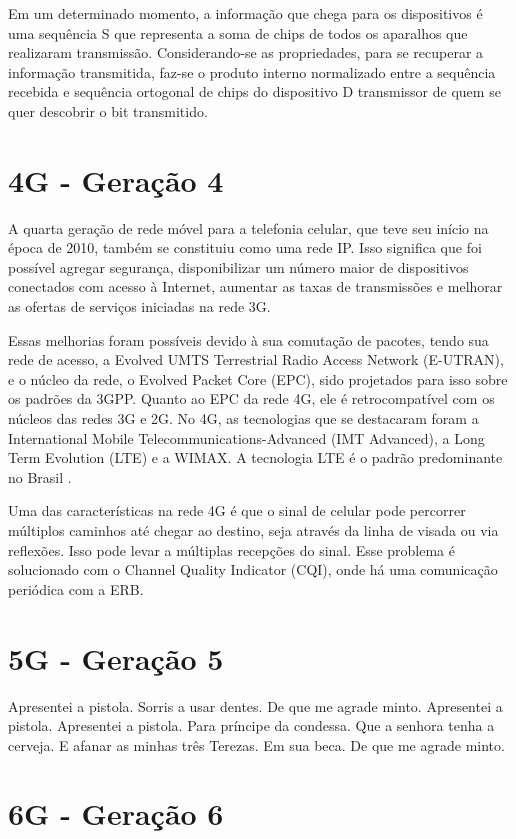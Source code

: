 \documentclass[11pt,oneside,a4paper]{abntex2}
\begin{document}
Em um determinado momento, a informação que chega para os dispositivos é uma sequência S que representa a soma de chips de todos os aparalhos que realizaram transmissão. Considerando-se as propriedades, para se recuperar a informação transmitida, faz-se o produto interno normalizado entre a sequência recebida e sequência ortogonal de chips do dispositivo D transmissor de quem se quer descobrir o bit transmitido.

\section*{4G - Geração 4}
\label{4g}

A quarta geração de rede móvel para a telefonia celular, que teve seu início na época de 2010, também se constituiu como uma rede IP. Isso significa que foi possível agregar segurança, disponibilizar um número maior de dispositivos conectados com acesso à Internet, aumentar as taxas de transmissões e melhorar as ofertas de serviços iniciadas na rede 3G.

Essas melhorias foram possíveis devido à sua comutação de pacotes, tendo sua rede de acesso, a Evolved UMTS Terrestrial Radio Access Network (E-UTRAN), e o núcleo da rede, o Evolved Packet Core (EPC), sido projetados para isso sobre os padrões da 3GPP. Quanto ao EPC da rede 4G, ele é retrocompatível com os núcleos das redes 3G e 2G. No 4G, as tecnologias que se destacaram foram a International Mobile Telecommunications-Advanced (IMT Advanced), a Long Term Evolution (LTE) \cite{aula5} e a WIMAX. A tecnologia LTE é o padrão predominante no Brasil \cite{tcc2}.

Uma das características na rede 4G é que o sinal de celular pode percorrer múltiplos caminhos até chegar ao destino, seja através da linha de visada ou via reflexões. Isso pode levar a múltiplas recepções do sinal. Esse problema é solucionado com o Channel Quality Indicator (CQI), onde há uma comunicação periódica com a ERB.

\section*{5G - Geração 5}
\label{5g}

Apresentei a pistola. Sorris a usar dentes. De que me agrade minto. Apresentei a pistola. Apresentei a pistola. Para príncipe da condessa. Que a senhora tenha a cerveja. E afanar as minhas três Terezas. Em sua beca. De que me agrade minto.

\section*{6G - Geração 6}
\label{6g}
\end{document}
